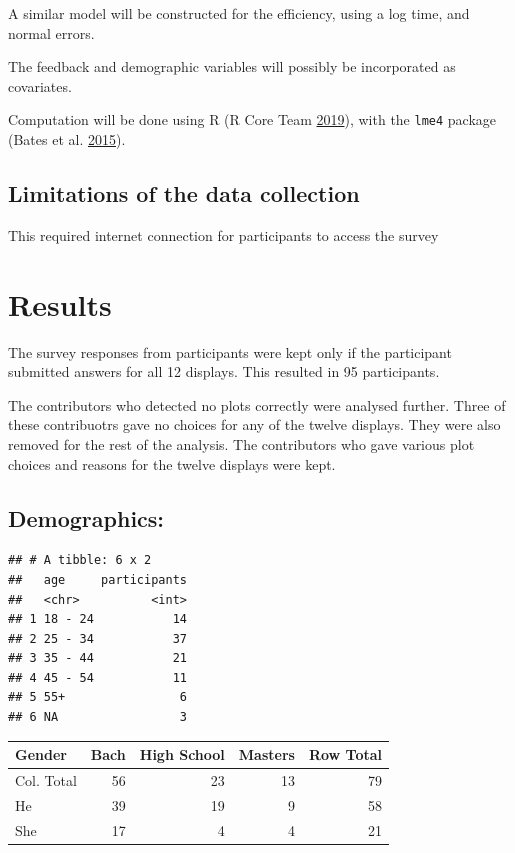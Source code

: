 \documentclass[conference,final,]{IEEEtran}
\begin{document}
A similar model will be constructed for the efficiency, using a log
time, and normal errors.

The feedback and demographic variables will possibly be incorporated as
covariates.

Computation will be done using R (R Core Team
\protect\hyperlink{ref-RCore}{2019}), with the \texttt{lme4} package
(Bates et al. \protect\hyperlink{ref-lme4}{2015}).

\hypertarget{limitations-of-the-data-collection}{%
\subsection{Limitations of the data
collection}\label{limitations-of-the-data-collection}}

This required internet connection for participants to access the survey

\hypertarget{results}{%
\section{Results}\label{results}}

The survey responses from participants were kept only if the participant
submitted answers for all 12 displays. This resulted in 95 participants.

The contributors who detected no plots correctly were analysed further.
Three of these contribuotrs gave no choices for any of the twelve
displays. They were also removed for the rest of the analysis. The
contributors who gave various plot choices and reasons for the twelve
displays were kept.

\hypertarget{demographics}{%
\subsection{Demographics:}\label{demographics}}

\begin{verbatim}
## # A tibble: 6 x 2
##   age     participants
##   <chr>          <int>
## 1 18 - 24           14
## 2 25 - 34           37
## 3 35 - 44           21
## 4 45 - 54           11
## 5 55+                6
## 6 NA                 3
\end{verbatim}

\begin{tabular}{l|r|r|r|r}
\hline
Gender & Bach & High School & Masters & Row Total\\
\hline
Col. Total & 56 & 23 & 13 & 79\\
\hline
He & 39 & 19 & 9 & 58\\
\hline
She & 17 & 4 & 4 & 21\\
\hline
\end{tabular}
\end{document}
